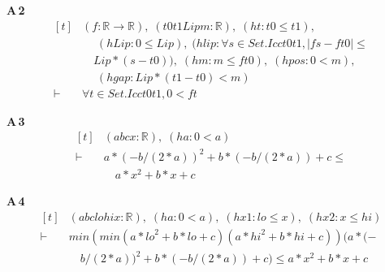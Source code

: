 \noindent\textbf{A\,2}\quad{}
{\footnotesize\[ \begin{aligned}[t]
&(\mathit{f} : \mathbb{R} \to \mathbb{R} ),\; (\mathit{t0} \mathit{t1} \mathit{Lip} \mathit{m} : \mathbb{R} ),\; (\mathit{ht} : \mathit{t0} \leq \mathit{t1}),\\
&\quad \; (\mathit{hLip} : 0 \leq \mathit{Lip}),\; (\mathit{hlip} : \forall \mathit{s} \in \mathit{Set}.\mathit{Icc} \mathit{t0} \mathit{t1}, |\mathit{f} \mathit{s} - \mathit{f} \mathit{t0}| \leq\\
&\quad \mathit{Lip} * (\mathit{s} - \mathit{t0})),\; (\mathit{hm} : \mathit{m} \leq \mathit{f} \mathit{t0}),\; (\mathit{hpos} : 0 < \mathit{m}),\\
&\quad \; (\mathit{hgap} : \mathit{Lip} * (\mathit{t1} - \mathit{t0}) < \mathit{m})\\
\vdash\;&\forall \mathit{t} \in \mathit{Set}.\mathit{Icc} \mathit{t0} \mathit{t1}, 0 < \mathit{f} \mathit{t}
\end{aligned} \]}

\noindent\textbf{A\,3}\quad{}
{\footnotesize\[ \begin{aligned}[t]
&(\mathit{a} \mathit{b} \mathit{c} \mathit{x} : \mathbb{R} ),\; (\mathit{ha} : 0 < \mathit{a})\\
\vdash\;&\mathit{a} * (-\mathit{b} / (2 * \mathit{a})) ^{2} + \mathit{b} * (-\mathit{b} / (2 * \mathit{a})) + \mathit{c} \leq\\
&\quad \mathit{a} * \mathit{x} ^{2} + \mathit{b} * \mathit{x} + \mathit{c}
\end{aligned} \]}

\noindent\textbf{A\,4}\quad{}
{\footnotesize\[ \begin{aligned}[t]
&(\mathit{a} \mathit{b} \mathit{c} \mathit{lo} \mathit{hi} \mathit{x} : \mathbb{R} ),\; (\mathit{ha} : 0 < \mathit{a}),\; (\mathit{hx1} : \mathit{lo} \leq \mathit{x}),\; (\mathit{hx2} : \mathit{x} \leq \mathit{hi})\\
\vdash\;&\mathit{min} (\mathit{min} (\mathit{a} * \mathit{lo} ^{2} + \mathit{b} * \mathit{lo} + \mathit{c}) (\mathit{a} * \mathit{hi} ^{2} + \mathit{b} * \mathit{hi} + \mathit{c})) (\mathit{a} * (-\\
&\quad \mathit{b} / (2 * \mathit{a})) ^{2} + \mathit{b} * (-\mathit{b} / (2 * \mathit{a})) + \mathit{c}) \leq \mathit{a} * \mathit{x} ^{2} + \mathit{b} * \mathit{x} + \mathit{c}
\end{aligned} \]}


